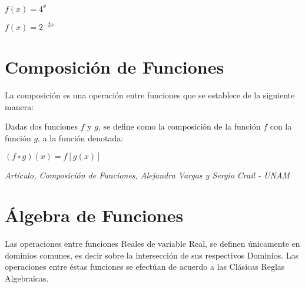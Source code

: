 \documentclass[12pt,a4paper]{book}
\begin{document}
{\begin{center}
\end{center}

 $f(x)=4^x$

\begin{center}
\end{center}

 $f(x)=2^{-2x}$

\section{Composición de Funciones}
La composición es una operación entre funciones que se establece de la siguiente manera: 
\begin{framed}\noindent
Dadas  dos  funciones  $f$ y $g$, se define como la  composición de la función  $f$ con  la  función $g$, a la función denotada:
\begin{center}
 $(f \circ g)(x) = f [ g(x) ]$
\end{center}
\begin{flushright}
\textit{{\scriptsize Artículo, Composición de Funciones, Alejandra Vargas y Sergio Crail - UNAM}}
\end{flushright}
\vspace{-0.5cm}
\end{framed}

\section{Álgebra de Funciones}
\begin{framed}\noindent
Las operaciones entre funciones Reales de variable Real, se definen únicamente en dominios comunes, es decir sobre la intersección de sus respectivos Dominios. Las operaciones entre éstas funciones se efectúan de acuerdo a las Clásicas Reglas Algebraicas.
\end{framed}
}
\end{document}
